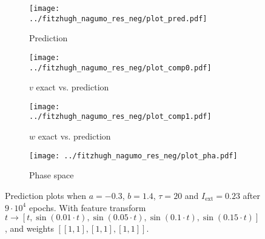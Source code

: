 \documentclass[a4paper]{article}
\begin{document}
\begin{figure}[H]
	\centering 
	\begin{subfigure}[b]{0.47\textwidth}
		\centering
		\texttt{[image: ../fitzhugh\_nagumo\_res\_neg/plot\_pred.pdf]}
		\caption{Prediction}
		\label{fig:neg1a}
	\end{subfigure}
	\begin{subfigure}[b]{0.47\textwidth}
		\centering
		\texttt{[image: ../fitzhugh\_nagumo\_res\_neg/plot\_comp0.pdf]}
		\caption{$v$ exact vs. prediction}
		\label{fig:neg1b}
	\end{subfigure}
	\begin{subfigure}[b]{0.47\textwidth}
		\centering
		\texttt{[image: ../fitzhugh\_nagumo\_res\_neg/plot\_comp1.pdf]}
		\caption{$w$ exact vs. prediction}
		\label{fig:neg1c}
	\end{subfigure}
	\begin{subfigure}[b]{0.47\textwidth}
		\centering
		\texttt{[image: ../fitzhugh\_nagumo\_res\_neg/plot\_pha.pdf]}
		\caption{Phase space}
		\label{fig:neg1d}
	\end{subfigure}
	\caption{Prediction plots when $a=-0.3$, $b=1.4$, $\tau=20$ and $ I_{\text{ext}}=0.23$ after $9\cdot10^4$ epochs. With feature transform $t \rightarrow \left[ t, \sin(0.01 \cdot  t), \sin(0.05 \cdot  t), \sin(0.1 \cdot  t), \sin(0.15 \cdot  t)\right] $, and weights $\left[ \left[ 1, 1\right], \left[ 1, 1\right], \left[ 1, 1\right]\right]$.}
	\label{plot:neg1}
\end{figure}
\end{document}
